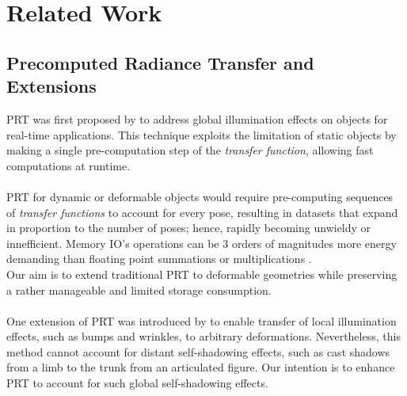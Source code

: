 \section{Related Work}
\subsection*{Precomputed Radiance Transfer and Extensions} 
PRT was first proposed by \cite{sloan2002precomputed} to address global illumination effects on objects for real-time applications. This technique exploits the limitation of static objects by making a single pre-computation step of the \textit{transfer function}, allowing fast computations at runtime. \\
\\
PRT for dynamic or deformable objects would require pre-computing sequences of \textit{transfer functions} to account for every pose, resulting in datasets that expand in proportion to the number of poses; hence, rapidly becoming unwieldy or innefficient. Memory IO's operations can be 3 orders of magnitudes more energy demanding than floating point summations or multiplications \cite{ComputingEnergy}.\\
Our aim is to extend traditional PRT to deformable geometries while preserving a rather manageable and limited storage consumption.
\\
\\
One extension of PRT was introduced by  \cite{local-deformable-precomputed-radiance-transfer} to enable transfer of local illumination effects, such as bumps and wrinkles, to arbitrary deformations.  Nevertheless, this method cannot account for distant self-shadowing effects, such as cast shadows from a limb to the trunk from an articulated figure. Our intention is to enhance PRT to account for such global self-shadowing effects.\\
